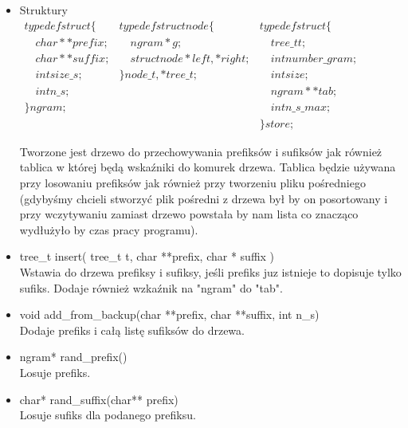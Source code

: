 \documentclass[12pt,a4paper]{report}
\begin{document}
		\begin{itemize}
			\item Struktury \\
			$\begin{array}{lll}
				typedef struct \{ 				& typedef struct node \{ 					& typedef struct \{ \\ 
				\hspace{1em}char ** prefix; 	& 	\hspace{1em}ngram * g; 					& \hspace{1em}	tree\_t t; \\ 
				\hspace{1em}char ** suffix; 	& 	\hspace{1em}struct node *left, *right; 	& \hspace{1em}	int number\_gram; \\ 
					\hspace{1em}int size\_s; 	& \} node\_t, *tree\_t; 					& 	\hspace{1em}int size; \\ 
						\hspace{1em}int n\_s; 	&  											& \hspace{1em}	ngram** tab; \\ 
					\} ngram; 					&  											& 	\hspace{1em}int n\_s\_max; \\ 
												&  											& \} store;
			\end{array} $ \linebreak
			
			Tworzone jest drzewo do przechowywania prefiksów i sufiksów jak również tablica w której będą wskaźniki do komurek drzewa. Tablica będzie używana przy losowaniu prefiksów jak również przy tworzeniu pliku pośredniego (gdybyśmy chcieli stworzyć plik pośredni z drzewa był by on posortowany i przy wczytywaniu zamiast drzewo powstała by nam lista co znacząco wydłużyło by czas pracy programu).
			
			\item tree\_t insert( tree\_t t, char **prefix, char * suffix )\\
			Wstawia do drzewa prefiksy i sufiksy, jeśli prefiks juz istnieje to dopisuje tylko sufiks. Dodaje również wzkaźnik na "ngram" do "tab".
			
			\item void add\_from\_backup(char **prefix, char **suffix, int n\_s) \\
			Dodaje prefiks i całą listę sufiksów do drzewa.
			
			\item ngram* rand\_prefix() \\
			Losuje prefiks.
			
			\item char* rand\_suffix(char** prefix)\\
			Losuje sufiks dla podanego prefiksu.
			
		\end{itemize}
	
\end{document}

